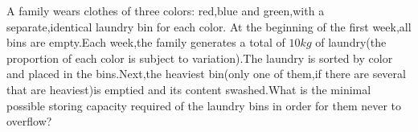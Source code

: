 A family wears clothes of three colors: red,blue and green,with a separate,identical laundry bin for each color. At the beginning of the first week,all bins are empty.Each week,the family generates a total of $10 kg $ of laundry(the proportion of each color is subject to variation).The laundry is sorted by color and placed in the bins.Next,the heaviest bin(only one of them,if there are several that are heaviest)is emptied and its content swashed.What is the minimal possible storing capacity required of the laundry bins in order for them never to overflow?
